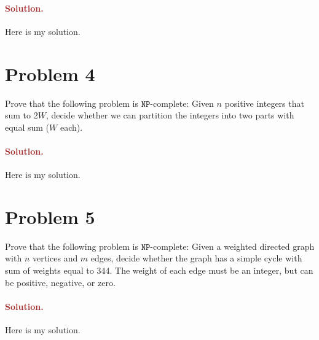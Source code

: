 \paragraph{\textcolor{brown}{Solution.}}
Here is my solution.


\section*{Problem 4}
Prove that the following problem is $\mathtt{NP}$-complete: Given $n$ positive integers that sum to $2W$, decide whether we can partition the integers into two parts with equal sum ($W$ each).

\paragraph{\textcolor{brown}{Solution.}}
Here is my solution.


\section*{Problem 5}
Prove that the following problem is $\mathtt{NP}$-complete: Given a weighted directed graph with $n$ vertices and $m$ edges, decide whether the graph has a simple cycle with sum of weights equal to $344$. The weight of each edge must be an integer, but can be positive, negative, or zero.

\paragraph{\textcolor{brown}{Solution.}}
Here is my solution.
